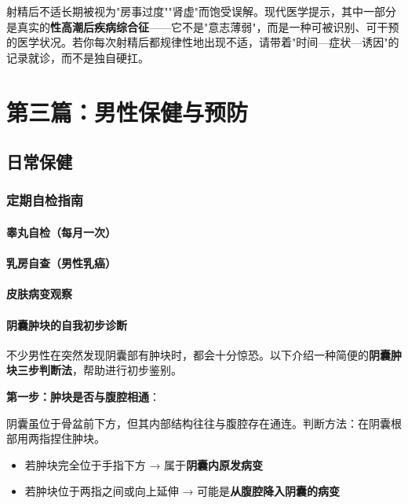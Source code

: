 \begin{tcolorbox}[colback=pink!5!white,colframe=red!50!black,title=贴心小叮咛]
射精后不适长期被视为"房事过度""肾虚"而饱受误解。现代医学提示，其中一部分是真实的\textbf{性高潮后疾病综合征}——它不是"意志薄弱"，而是一种可被识别、可干预的医学状况。若你每次射精后都规律性地出现不适，请带着"时间—症状—诱因"的记录就诊，而不是独自硬扛。
\end{tcolorbox}


\part{第三篇：男性保健与预防}

\chapter{日常保健}

\section{定期自检指南}
\subsection{睾丸自检（每月一次）}
\subsection{乳房自查（男性乳癌）}
\subsection{皮肤病变观察}
\subsection{阴囊肿块的自我初步诊断}

不少男性在突然发现阴囊部有肿块时，都会十分惊恐。以下介绍一种简便的\textbf{阴囊肿块三步判断法}，帮助进行初步鉴别。

\vspace{0.5em}
\noindent\textbf{第一步：肿块是否与腹腔相通}：

阴囊虽位于骨盆前下方，但其内部结构往往与腹腔存在通连。判断方法：在阴囊根部用两指捏住肿块。
\begin{itemize}
	\item 若肿块完全位于手指下方 → 属于\textbf{阴囊内原发病变}
	\item 若肿块位于两指之间或向上延伸 → 可能是\textbf{从腹腔降入阴囊的病变}
\end{itemize}

